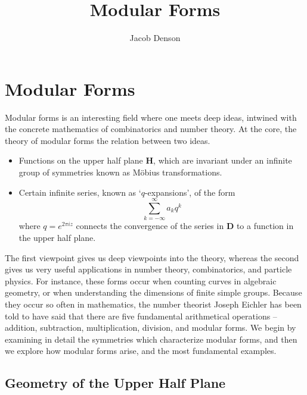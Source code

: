 

\title{Modular Forms}
\author{Jacob Denson}




\maketitle

\tableofcontents


\chapter{Modular Forms}

Modular forms is an interesting field where one meets deep ideas, intwined with the concrete mathematics of combinatorics and number theory. At the core, the theory of modular forms the relation between two ideas.
%
\begin{itemize}
    \item Functions on the upper half plane $\mathbf{H}$, which are invariant under an infinite group of symmetries known as M\"{o}bius transformations.
    \item Certain infinite series, known as `$q$-expansions', of the form
    \[ \sum_{k = -\infty}^\infty a_k q^k \]
    where $q = e^{2 \pi i z}$ connects the convergence of the series in $\mathbf{D}$ to a function in the upper half plane.
\end{itemize}
%
The first viewpoint gives us deep viewpoints into the theory, whereas the second gives us very useful applications in number theory, combinatorics, and particle physics. For instance, these forms occur when counting curves in algebraic geometry, or when understanding the dimensions of finite simple groups. Because they occur so often in mathematics, the number theorist Joseph Eichler has been told to have said that there are five fundamental arithmetical operations -- addition, subtraction, multiplication, division, and modular forms. We begin by examining in detail the symmetries which characterize modular forms, and then we explore how modular forms arise, and the most fundamental examples.

\section{Geometry of the Upper Half Plane}

